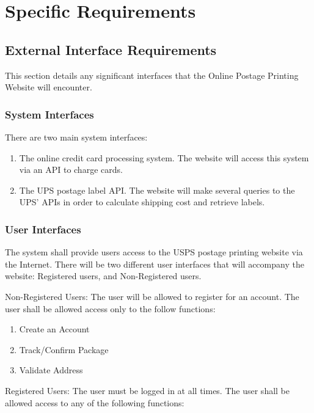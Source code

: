 \documentclass{scrreprt}
\begin{document}
\chapter{Specific Requirements}

\section{External Interface Requirements}

This section details any significant interfaces that the Online 
Postage Printing Website will encounter.

\subsection{System Interfaces}

There are two main system interfaces:

\begin{enumerate}
\item The online credit card processing system. The website will 
access this system via an API to charge cards.
\item The UPS postage label API. The website will make several 
queries to the UPS' APIs in order to calculate shipping cost and 
retrieve labels.
\end{enumerate}

\subsection{User Interfaces}

The system shall provide users access to the USPS postage printing website via
the Internet. There will be two different user interfaces that will accompany
the website: Registered users, and Non-Registered users.

Non-Registered Users: The user will be allowed to register for an account.
The user shall be allowed access only to the follow functions:

\begin{enumerate}
\item Create an Account
\item Track/Confirm Package
\item Validate Address
\end{enumerate}

Registered Users: The user must be logged in at all times. 
The user shall be allowed access to any of the following functions:
\end{document}
